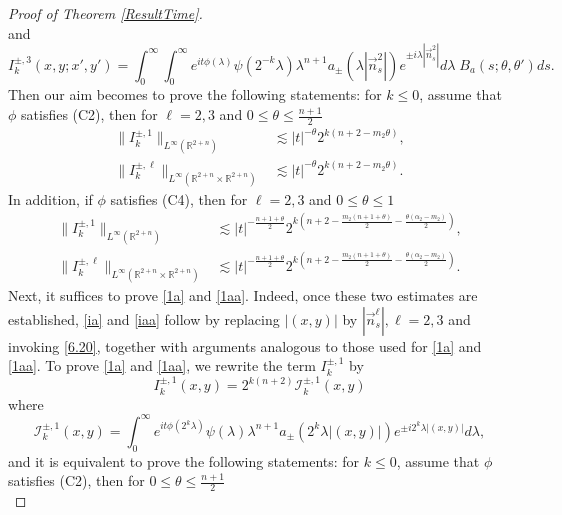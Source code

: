 \documentclass[a4paper,11pt, reqno]{amsart}
\numberwithin{equation}{section}
\theoremstyle{plain}
\theoremstyle{definition}
\theoremstyle{remark}
\begin{document}
\begin{proof}[Proof of Theorem \ref{ResultTime}]
\begin{equation*}
\end{equation*}
and
\begin{equation*}
I_k^{\pm,3}(x,y;x',y')=\int_0^\infty \int_0^\infty  e^{it\phi(\lambda)} \psi(2^{-k}\lambda)\lambda^{n+1}a_{\pm}(\lambda|\overset{\rightarrow}{n}_s^2|)e^{\pm i\lambda|\overset{\rightarrow}{n}_s^2|}d\lambda\; B_a(s;\theta,\theta')ds.
\end{equation*}
Then our aim becomes to prove the following statements: for $k \leq 0$, assume that $\phi$ satisfies (C2), then for $\ell=2,3$ and $0 \leq \theta \leq \frac{n+1}{2}$
	\begin{align}
	\|I^{\pm,1}_k\|_{L^\infty(\mathbb{R}^{2+n})} &\lesssim |t|^{-\theta}2^{k\left(n+2-m_2\theta\right)},\label{1a}\\
    \|I^{\pm,\ell}_k\|_{L^\infty(\mathbb{R}^{2+n}\times\mathbb{R}^{2+n})} &\lesssim |t|^{-\theta}2^{k\left(n+2-m_2\theta\right)}. \label{ia}
	\end{align}
 In addition, if $\phi$ satisfies (C4), then for $\ell=2,3$ and $0 \leq \theta \leq 1$
 \begin{align}
	\|I^{\pm,1}_k\|_{L^\infty(\mathbb{R}^{2+n})} &\lesssim |t|^{-\frac{n+1+\theta}{2}}2^{k\left(n+2-\frac{m_2(n+1+\theta)}{2}-\frac{\theta(\alpha_2-m_2)}{2}\right)},\label{1aa}\\
    \|I^{\pm,\ell}_k\|_{L^\infty(\mathbb{R}^{2+n}\times\mathbb{R}^{2+n})} &\lesssim |t|^{-\frac{n+1+\theta}{2}}2^{k\left(n+2-\frac{m_2(n+1+\theta)}{2}-\frac{\theta(\alpha_2-m_2)}{2}\right)}. \label{iaa}
	\end{align}
Next, it suffices to prove \eqref{1a} and \eqref{1aa}. Indeed, once these two estimates are established, \eqref{ia} and \eqref{iaa} follow by replacing $|(x,y)|$ by $|\overset{\rightarrow}{n}_s^\ell|, \ell=2,3$ and invoking \eqref{6.20}, together with arguments analogous to those used for \eqref{1a} and \eqref{1aa}. To prove  \eqref{1a} and \eqref{1aa},
we rewrite the term $I_k^{\pm,1}$ by
\begin{equation*}
I_k^{\pm,1}(x,y)=2^{k(n+2)}\mathcal{I}_k^{\pm,1}(x,y)
\end{equation*}
where
\begin{equation*}
\mathcal{I}_k^{\pm,1}(x,y)=\int_0^\infty e^{it\phi(2^k\lambda)} \psi(\lambda)\lambda^{n+1}a_{\pm}(2^k\lambda|(x,y)|)e^{\pm i2^k\lambda|(x,y)|}d\lambda,
\end{equation*}
and it is equivalent to prove the following statements: 
for $k \leq 0$, assume that $\phi$ satisfies (C2), then for $0 \leq \theta \leq \frac{n+1}{2}$
	\begin{equation}

\end{equation}
\end{proof}
\end{document}
